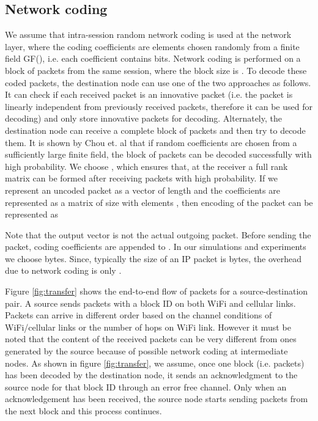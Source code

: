 \documentclass{sig-alternate-10pt}
\begin{document}
\subsection{Network coding }
We assume that intra-session random network coding is used at the network layer, where the coding coefficients are elements chosen randomly from a finite field GF(), i.e. each coefficient contains  bits.  Network coding is performed on a block of packets from the same session, where the block size is . To decode these coded packets, the destination node can use one of the two approaches as follows. It can  check if each received packet is an innovative packet (i.e. the packet is linearly independent from previously received packets, therefore it can be used for decoding)  and only store innovative packets for decoding. Alternately, the destination node can receive a complete block of packets and then try to decode them. It is shown by Chou et. al \cite{Chou03practicalnetwork} that if random coefficients are chosen from a sufficiently large finite field, the block of packets can be decoded successfully with high probability. We choose , which ensures that, at the receiver a full rank matrix can be formed after receiving  packets with high probability.  If we represent an uncoded packet as a vector  of length  and the coefficients are represented as a matrix of size  with elements , then encoding of the packet can be represented as 
 
Note that the output vector  is not the actual outgoing packet. Before sending the packet, coding coefficients  are appended to . In our simulations and experiments we choose  bytes. Since, typically the size of an IP packet is  bytes, the overhead due to network coding is only  .

Figure \ref{fig:transfer} shows the end-to-end flow of packets for a source-destination pair. A source sends packets with a block ID on both WiFi and cellular links. Packets can arrive in different order based on the channel conditions of WiFi/cellular links or the number of hops on WiFi link. However it must be noted that the content of the received packets  can be very different from ones generated by the source because of possible network coding at intermediate nodes. As shown in figure \ref{fig:transfer}, we assume, once one block (i.e.  packets) has been decoded by the destination node, it sends an acknowledgment to the source node for that block ID through an error free channel. Only when an acknowledgement has been received, the source node starts sending packets from the next block and this process continues.
\end{document}
